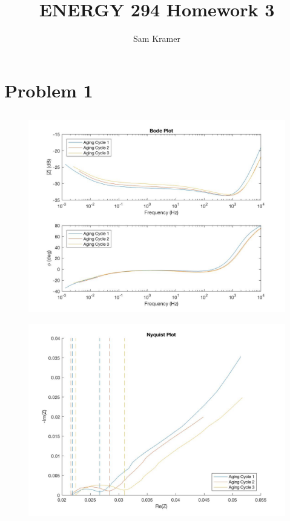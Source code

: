\documentclass[a4paper,12pt]{extarticle}
\title{ENERGY 294 Homework 3}
\author{Sam Kramer}
\begin{document}
\maketitle

\section{Problem 1}

\subsection{}

\begin{figure}[h]
\centering
\includegraphics[width=\textwidth]{bode.jpg}
\end{figure}

\begin{figure}[h]
\centering
\includegraphics[width=\textwidth]{nyquist.jpg}
\end{figure}
\end{document}
